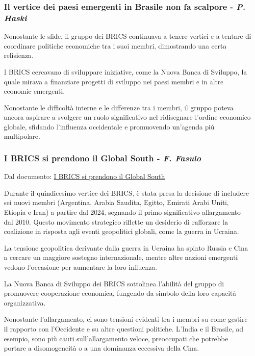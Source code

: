 \documentclass{article}
\begin{document}
\subsubsection{Il vertice dei paesi emergenti in Brasile non fa scalpore - \textit{P. Haski}}
Nonostante le sfide, il gruppo dei BRICS continuava a tenere vertici e a tentare di coordinare
politiche economiche tra i suoi membri, dimostrando una certa relisienza.

I BRICS cercavano di sviluppare iniziative, come la Nuova Banca di Sviluppo, la quale mirava
a finanziare progetti di sviluppo nei paesi membri e in altre economie emergenti.

Nonostante le difficoltà interne e le differenze tra i membri, il gruppo poteva ancora aspirare
a svolgere un ruolo significativo nel ridisegnare l'ordine economico globale, sfidando
l'influenza occidentale e promuovendo un'agenda più multipolare.
\pagebreak

\subsubsection{I BRICS si prendono il Global South - \textit{F. Fasulo}}
Dal documento: \href{https://github.com/matteofrongillo/passerella/blob/main/Geografia/media/ISPI_I BRICS si prendono il Global South.pdf?raw=true}{I BRICS si prendono il Global South}

Durante il quindicesimo vertice dei BRICS, è stata presa la decisione di includere sei
nuovi membri (Argentina, Arabia Saudita, Egitto, Emirati Arabi Uniti, Etiopia e Iran) a partire
dal 2024, segnando il primo significativo allargamento dal 2010. Questo movimento strategico
riflette un desiderio di rafforzare la coalizione in risposta agli eventi geopolitici globali,
come la guerra in Ucraina.

La tensione geopolitica derivante dalla guerra in Ucraina ha spinto Russia e Cina a cercare un
maggiore sostegno internazionale, mentre altre nazioni emergenti vedono l'occasione per
aumentare la loro influenza.

La Nuova Banca di Sviluppo dei BRICS sottolinea l'abilità del gruppo di promuovere cooperazione
economica, fungendo da simbolo della loro capacità organizzativa.

Nonostante l'allargamento, ci sono tensioni evidenti tra i membri su come gestire il rapporto
con l'Occidente e su altre questioni politiche. L'India e il Brasile, ad esempio, sono più
cauti sull'allargamento veloce, preoccupati che potrebbe portare a disomogeneità o a una
dominanza eccessiva della Cina.
\end{document}
